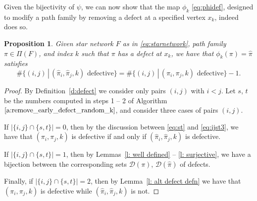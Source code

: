 \documentclass[12pt]{amsart}
\newtheorem{prop}[thm]{Proposition}
\theoremstyle{definition}
\numberwithin{equation}{section}
\newcommand{\sn}{\mathfrak{S}_n}
\newcommand{\D}{\mathcal{D}}
\newcommand{\ctr}[1]{{x}_{#1}}
\begin{document}

Given the bijectivity of $\psi$, we can now show that the map $\phi_k$
\eqref{eq:phidef}, designed to modify a path family by removing a defect at
a specified vertex $x_k$, indeed does so.
    \begin{prop}\label{p:remove one defect}
        Given star network 
    $F$ as in \eqref{eq:starnetwork}, 
    path family $\pi \in \Pi(F)$,
    and index $k$ such that $\pi$ has a defect at $\ctr k$,  we have that $\phi_k(\pi)=\hat\pi$ satisfies
        \begin{equation*}\#\{(i,j) \,|\, (\hat\pi_i, \hat\pi_j, k) \text{ defective}\} = \#\{(i,j) \,|\, (\pi_i, \pi_j, k) \text{ defective}\} - 1.\end{equation*} 
\end{prop}
\begin{proof}
By Definition~\ref{d:defect} we consider only pairs $(i,j)$ with $i<j$.
Let $s$, $t$
be the numbers computed in steps 1 -- 2 of 
Algorithm~$\ref{a:remove_early_defect_random_k}$,
and consider three cases of pairs $(i,j)$.

If $|\{i,j\} \cap \{s,t\}| = 0$, then  
by the discussion between \eqref{eq:st} and \eqref{eq:ijst3},
we have that $(\pi_i, \pi_j, k)$ is defective 
if and only if $(\hat\pi_i, \hat\pi_j, k)$ is defective.

If $|\{i,j\} \cap \{s,t\}| = 1$,
then by Lemmas~\ref{l: well defined} -- \ref{l: surjective},
we have a bijection between the corresponding sets $\D(\pi)$, $\D(\hat\pi)$
of defects.

Finally, if $|\{i,j\} \cap \{s,t\}| = 2$,
then by Lemma~\ref{l: alt defect defn} we have that
$(\pi_i, \pi_j, k)$ 
is defective while $(\hat \pi_i, \hat \pi_j, k)$ is not.
\end{proof}
\end{document}
